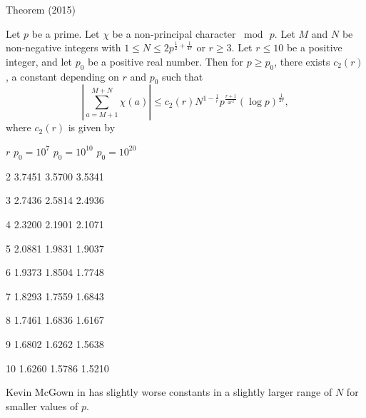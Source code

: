 \begin{thm}{Theorem (2015)}

Let $p$ be a prime. Let $\chi$ be a non-principal character
$\bmod{\,p}$. Let $M$ and $N$ be non-negative integers with $1\le N\le
2 p^{\frac{1}{2} + \frac{1}{4r}}$ or $r\ge 3$. Let $r\le 10$ be a
positive integer, and let $p_0$ be a positive real number. Then for $p
\ge p_0$, there exists $c_2(r)$, a constant depending on $r$ and $p_0$
such that 
$$
\left|\sum_{a=M+1}^{M+N}\chi(a)\right|
\le
 c_2(r) N^{1-\frac{1}{r}} p^{\frac{r+1}{4r^2}}(\log{p})^{\frac{1}{2r}},
$$
where $c_2(r)$ is given by
  
  
  
    
      $r$
      $p_0=10^7$
      $p_0=10^{10}$
      $p_0=10^{20}$
    
  
  
    2
    3.7451
    3.5700
    3.5341
  
  
    3
    2.7436
    2.5814
    2.4936
  
  
    4
    2.3200
    2.1901
    2.1071
  
  
    5
    2.0881
    1.9831
    1.9037
  
  
    6
    1.9373
    1.8504
    1.7748
  
  
    7
    1.8293
    1.7559
    1.6843
  
  
    8
    1.7461
    1.6836
    1.6167
  
  
    9
    1.6802
    1.6262
    1.5638
  
  
    10
    1.6260
    1.5786
    1.5210
  
 

\end{thm}



Kevin McGown  in
\cite{McGown*12}
has slightly worse constants in a slightly larger range of $N$ for
smaller values of $p$.

